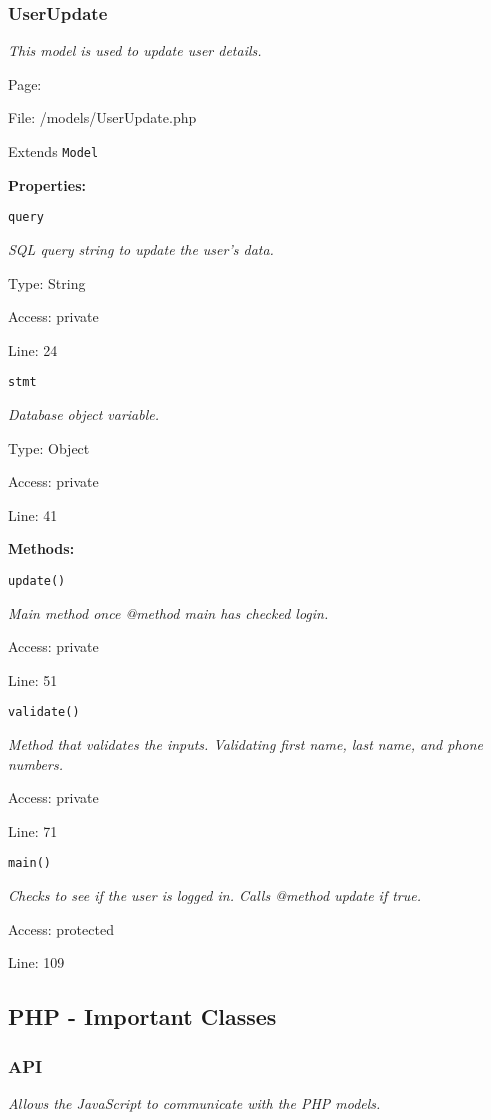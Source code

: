 \subsubsection{UserUpdate}\label{UserUpdate.php.doc}
\textit{This model is used to update user details.}

Page: \pageref{UserUpdate.php}

File: /models/UserUpdate.php

Extends \texttt{Model}

\textbf{Properties:}

\texttt{query}

{\scriptsize
\textit{SQL query string to update the user's data.}

Type: String

Access: private

Line: 24

}
\texttt{stmt}

{\scriptsize
\textit{Database object variable.}

Type: Object

Access: private

Line: 41

}
\textbf{Methods:}

\texttt{update()}

{\scriptsize
\textit{Main method once @method main has checked login.}

Access: private

Line: 51

}

\texttt{validate()}

{\scriptsize
\textit{Method that validates the inputs.
Validating first name, last name, and phone numbers.}

Access: private

Line: 71

}

\texttt{main()}

{\scriptsize
\textit{Checks to see if the user is logged in.
Calls @method update if true.}

Access: protected

Line: 109

}

\subsection{PHP - Important Classes}
\subsubsection{API}\label{API.php.doc}
\textit{Allows the JavaScript to communicate with the PHP models.}

